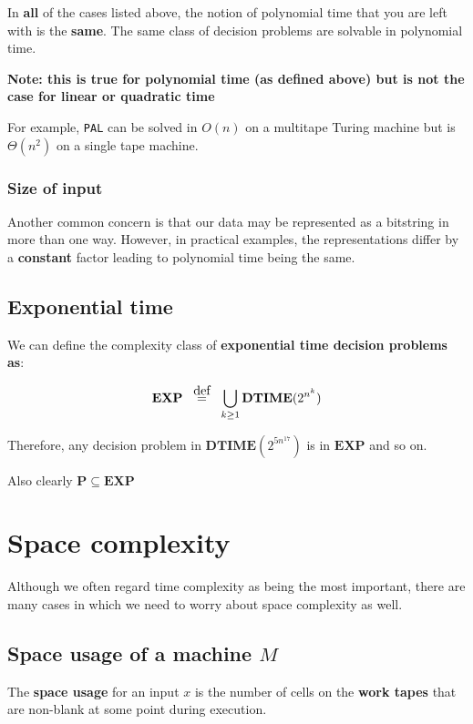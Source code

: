 \documentclass{article}
\newcommand{\defeq}{\stackrel{\mathclap{\normalfont\mbox{def}}}{=}}
\begin{document}
In \textbf{all} of the cases listed above, the notion of polynomial time that you are left with is the \textbf{same}. The same class of decision problems are solvable in polynomial time.

\textbf{Note: this is true for polynomial time (as defined above) but is not the case for linear or quadratic time }

For example, \texttt{PAL} can be solved in $O(n)$ on a multitape Turing machine but is $\Theta(n^{2})$ on a single tape machine.

\subsubsection{Size of input}

Another common concern is that our data may be represented as a bitstring in more than one way. However, in practical examples, the representations differ by a \textbf{constant} factor leading to polynomial time being the same.

\subsection{Exponential time}

We can define the complexity class of \textbf{exponential time decision problems as}:

\[
  \mathbf{EXP} \;\;\; \defeq \;\;\; \bigcup_{k\geq 1 }\mathbf{DTIME} (2^{n^{k}})
\]

Therefore, any decision problem in $\mathbf{DTIME} (2^{5n^{17}})$ is in $\mathbf{EXP} $ and so on.

Also clearly $\mathbf{P} \subseteq \mathbf{EXP} $

\section{Space complexity}

Although we often regard time complexity as being the most important, there are many cases in which we need to worry about space complexity as well.

\subsection{Space usage of a machine $M$}

The \textbf{space usage} for an input $x$ is the number of cells on the \textbf{work tapes} that are non-blank at some point during execution.
\end{document}

